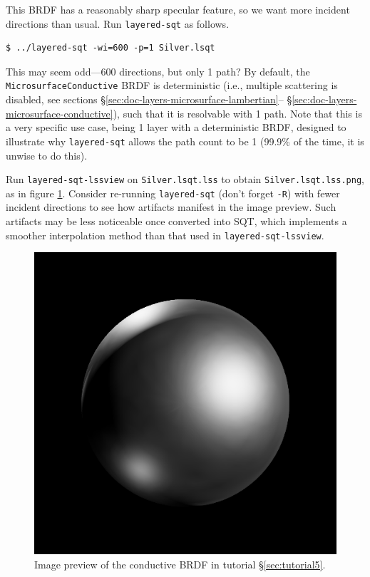 \documentclass[
    twoside,
    twocolumn,
    letterpaper,
    10pt]{article}
\newcommand\namett[2]{{\color{code#1}\texttt{#2}}}
\begin{document}
This BRDF has a reasonably sharp specular feature, so we want 
more incident directions than usual. Run \texttt{layered-sqt} as follows.
\begin{verbatim}
$ ../layered-sqt -wi=600 -p=1 Silver.lsqt
\end{verbatim}
This may seem odd---600 directions, but only 1 path? By default, the 
\namett{purple}{MicrosurfaceConductive} BRDF is deterministic (i.e., multiple 
scattering is disabled, see sections 
\S\ref{sec:doc-layers-microsurface-lambertian}--%
\S\ref{sec:doc-layers-microsurface-conductive}), such that it 
is resolvable with 1 path. Note that this is a very specific use
case, being 1 layer with a deterministic BRDF, designed to illustrate
why \texttt{layered-sqt} allows the path count to be 1 (99.9\% of the
time, it is unwise to do this).

Run \texttt{layered-sqt-lssview} on \texttt{Silver.lsqt.lss} to obtain
\texttt{Silver.lsqt.lss.png}, as in figure \ref{fig:tutorial5}. Consider
re-running \texttt{layered-sqt} (don't forget \texttt{-R}) with fewer
incident directions to see how artifacts manifest in the image
preview. Such artifacts may be less noticeable once converted into 
SQT, which implements a smoother interpolation method than that used 
in \texttt{layered-sqt-lssview}.

\begin{figure}
\begin{center}
    \includegraphics[width=0.75\columnwidth]{tutorial5.png}
    \caption{Image preview of the conductive BRDF in tutorial 
    \S\ref{sec:tutorial5}.
    \label{fig:tutorial5}}
\end{center}
\end{figure}
\end{document}
